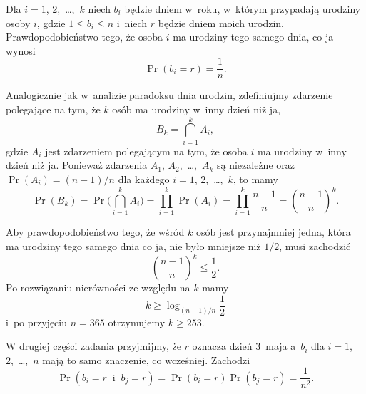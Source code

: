 
\exercise %
Dla $i=1$, 2,~\dots,~$k$ niech $b_i$ będzie dniem w~roku, w~którym przypadają urodziny osoby $i$, gdzie $1\le b_i\le n$ i~niech $r$ będzie dniem moich urodzin. Prawdopodobieństwo tego, że osoba $i$ ma urodziny tego samego dnia, co ja wynosi
\[
	\Pr(b_i=r) = \frac{1}{n}.
\]

Analogicznie jak w~analizie paradoksu dnia urodzin, zdefiniujmy zdarzenie polegające na tym, że $k$ osób ma urodziny w~inny dzień niż ja,
\[
	B_k = \bigcap_{i=1}^kA_i,
\]
gdzie $A_i$ jest zdarzeniem polegającym na tym, że osoba $i$ ma urodziny w~inny dzień niż ja. Ponieważ zdarzenia $A_1$, $A_2$,~\dots,~$A_k$ są niezależne oraz $\Pr(A_i)=(n-1)/n$ dla każdego $i=1$, 2,~\dots,~$k$, to mamy
\[
	\Pr(B_k) = \Pr\biggl(\bigcap_{i=1}^kA_i\biggr) = \prod_{i=1}^k\Pr(A_i) = \prod_{i=1}^k\frac{n-1}{n} = \left(\frac{n-1}{n}\right)^k.
\]

Aby prawdopodobieństwo tego, że wśród $k$ osób jest przynajmniej jedna, która ma urodziny tego samego dnia co ja, nie było mniejsze niż $1/2$, musi zachodzić
\[
	\left(\frac{n-1}{n}\right)^k \le \frac{1}{2}.
\]
Po rozwiązaniu nierówności ze względu na $k$ mamy
\[
	k \ge \log_{(n-1)/n}\frac{1}{2}
\]
i~po przyjęciu $n=365$ otrzymujemy $k\ge253$.

W drugiej części zadania przyjmijmy, że $r$ oznacza dzień 3~maja a~$b_i$ dla $i=1$, 2,~\dots,~$n$ mają to samo znaczenie, co wcześniej. Zachodzi
\[
	\Pr(b_i=r\;\;\text{i}\;\;b_j=r) = \Pr(b_i=r)\Pr(b_j=r) = \frac{1}{n^2}.
\]

